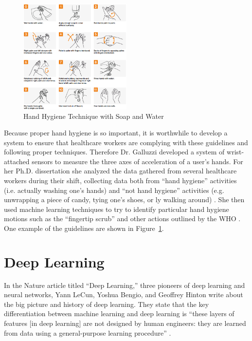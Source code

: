 \documentclass[]{report}
\begin{document}
\begin{figure}
	\centering
	\includegraphics[width=0.5\textwidth]{../images/handhygiene-summary}
	\caption{Hand Hygiene Technique with Soap and Water \cite{who2}}
	\label{hh-guidelines}
\end{figure}

Because proper hand hygiene is so important, it is worthwhile to develop a system to ensure that healthcare workers are complying with these guidelines and following proper techniques. Therefore Dr. Galluzzi developed a system of wrist-attached sensors to measure the three axes of acceleration of a user's hands. For her Ph.D. dissertation she analyzed the data gathered from several healthcare workers during their shift, collecting data both from ``hand hygiene'' activities (i.e. actually washing one's hands) and ``not hand hygiene'' activities (e.g. unwrapping a piece of candy, tying one's shoes, or ly walking around) \cite{Galluzzi}. She then used machine learning techniques to try to identify particular hand hygiene motions such as the ``fingertip scrub'' and other actions outlined by the WHO \cite{Galluzzi}. One example of the guidelines are shown in Figure~\ref{hh-guidelines}.






\section{Deep Learning}

In the Nature article titled ``Deep Learning,'' three pioneers of deep learning and neural networks, Yann LeCun, Yoshua Bengio, and Geoffrey Hinton write about the big picture and history of deep learning. They state that the key differentiation between machine learning and deep learning is ``these layers of features [in deep learning] are not designed by human engineers: they are learned from data using a general-purpose learning procedure'' \cite{ThreeGiants}. 
\end{document}
